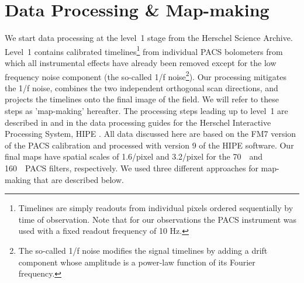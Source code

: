 \documentclass[manuscript]{aastex}
\begin{document}
\section{Data Processing \& Map-making}
\label{sec:dp}
\par
We start data processing at the level~1 stage from the Herschel Science Archive.  Level~1 contains calibrated timelines\footnote{Timelines are simply readouts from individual pixels ordered sequentially by time of observation.  Note that for our observations the PACS instrument was used with a fixed readout frequency of 10 Hz.} from individual PACS bolometers from which all instrumental effects have already been removed except for the low frequency noise component (the so-called 1/f noise\footnote{The so-called 1/f noise modifies the signal timelines by adding a drift component whose amplitude is a power-law function of its Fourier frequency.}).  Our processing mitigates the 1/f noise, combines the two independent orthogonal scan directions, and projects the timelines onto the final image of the field.  We will refer to these steps as 'map-making' hereafter.  The processing steps leading up to level~1 are described in \citet{pacs} and in the data processing guides for the Herschel Interactive Processing System, HIPE \cite{hipe}.  All data discussed here are based on the FM7 version of the PACS calibration \citep{pacscal} and processed with version 9 of the HIPE software.  Our final maps have spatial scales of 1.6\arcsec/pixel and 3.2\arcsec/pixel for the 70~\micron\ and 160~\micron\ PACS filters, respectively.  We used three different approaches for map-making that are described below.
\end{document}
